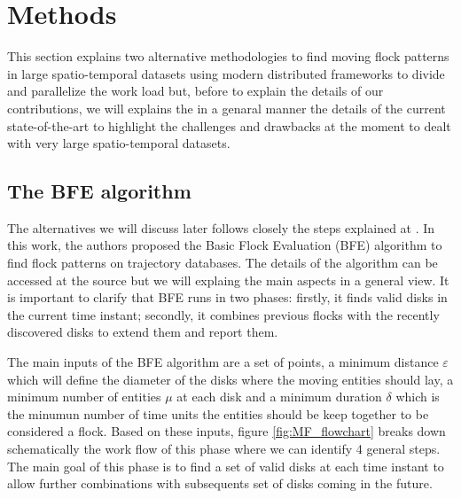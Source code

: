 
\section{Methods}
This section explains two alternative methodologies to find moving flock patterns in large spatio-temporal datasets using modern distributed frameworks to divide and parallelize the work load but,  before to explain the details of our contributions, we will explains the in a genaral manner the details of the current state-of-the-art to highlight the challenges and drawbacks at the moment to dealt with very large spatio-temporal datasets.

\subsection{The BFE algorithm}
The alternatives we will discuss later follows closely the steps explained at \cite{vieira_2009}.  In this work, the authors proposed the Basic Flock Evaluation (BFE) algorithm to find flock patterns on trajectory databases.  The details of the algorithm can be accessed at the source but we will explaing the main aspects in a general view.  It is important to clarify that BFE runs in two phases: firstly, it finds valid disks in the current time instant; secondly, it combines previous flocks with the recently discovered disks to extend them and report them.  

The main inputs of the BFE algorithm are a set of points, a minimum distance $\varepsilon$ which will define the diameter of the disks where the moving entities should lay, a minimum number of entities $\mu$ at each disk and a minimum duration $\delta$ which is the minumun number of time units the entities should be keep together to be considered a flock.  Based on these inputs,  figure \ref{fig:MF_flowchart} breaks down schematically the work flow  of this phase where we can identify 4 general steps.  The main goal of this phase is to find a set of valid disks at each time instant to allow further combinations with subsequents set of disks coming in the future.

